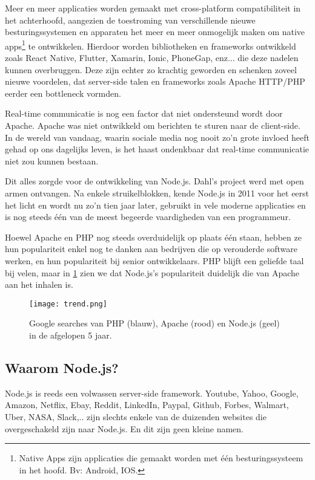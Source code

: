 Meer en meer applicaties worden gemaakt met cross-platform compatibiliteit in het achterhoofd, aangezien de toestroming van verschillende nieuwe besturingssystemen en apparaten het meer en meer onmogelijk maken om native apps\footnote{Native Apps zijn applicaties die gemaakt worden met één besturingssysteem in het hoofd. Bv: Android, IOS.} te ontwikkelen. Hierdoor worden bibliotheken en frameworks ontwikkeld zoals React Native, Flutter, Xamarin, Ionic, PhoneGap, enz... die deze nadelen kunnen overbruggen. Deze zijn echter zo krachtig geworden en schenken zoveel nieuwe voordelen, dat server-side talen en frameworks zoals Apache HTTP/PHP eerder een bottleneck vormden. 

Real-time communicatie is nog een factor dat niet ondersteund wordt door Apache. Apache was niet ontwikkeld om berichten te sturen naar de client-side. In de wereld van vandaag, waarin sociale media nog nooit zo'n grote invloed heeft gehad op ons dagelijks leven, is het haast ondenkbaar dat real-time communicatie niet zou kunnen bestaan. 

Dit alles zorgde voor de ontwikkeling van Node.js. Dahl's project werd met open armen ontvangen. Na enkele struikelblokken, kende Node.js in 2011 voor het eerst het licht en wordt nu zo'n tien jaar later, gebruikt in vele moderne applicaties en is nog steeds één van de meest begeerde vaardigheden van een programmeur. \autocite{Patel2018}

Hoewel Apache en PHP nog steeds overduidelijk op plaats één staan, hebben ze hun populariteit enkel nog te danken aan bedrijven die op verouderde software werken, en hun populariteit bij senior ontwikkelaars. PHP blijft een geliefde taal bij velen, maar in \ref{fig:trend} zien we dat Node.js's populariteit duidelijk die van Apache aan het inhalen is. \autocite{SimilarTech}

\begin{figure}[h]
	\texttt{[image: trend.png]}
	\caption{Google searches van PHP (blauw), Apache (rood) en Node.js (geel) in de afgelopen 5 jaar.}
	\label{fig:trend}
\end{figure}

\subsection{Waarom Node.js?}
\label{sec:whyNode}
Node.js is reeds een volwassen server-side framework. Youtube, Yahoo, Google, Amazon, Netflix, Ebay, Reddit, LinkedIn, Paypal, Github, Forbes, Walmart, Uber, NASA, Slack,.. zijn slechts enkele van de duizenden websites die overgeschakeld zijn naar Node.js. En dit zijn geen kleine namen.

